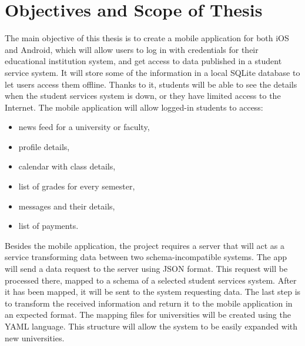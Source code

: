 \section{Objectives and Scope of Thesis}
The main objective of this thesis is to create a mobile application for both iOS and Android, which will allow users to log in with credentials for their educational institution system, and get access to data published in a student service system. It will store some of the information in a local SQLite database to let users access them offline. Thanks to it, students will be able to see the details when the student services system is down, or they have limited access to the Internet. 
The mobile application will allow logged-in students to access:
\begin{itemize}
    \item news feed for a university or faculty,
    \item profile details,
    \item calendar with class details,
    \item list of grades for every semester,
    \item messages and their details,
    \item list of payments.
\end{itemize}

Besides the mobile application, the project requires a server that will act as a service transforming data between two schema-incompatible systems. The app will send a data request to the server using JSON format. This request will be processed there, mapped to a schema of a selected student services system. After it has been mapped, it will be sent to the system requesting data. The last step is to transform the received information and return it to the mobile application in an expected format. The mapping files for universities will be created using the YAML language. This structure will allow the system to be easily expanded with new universities.

